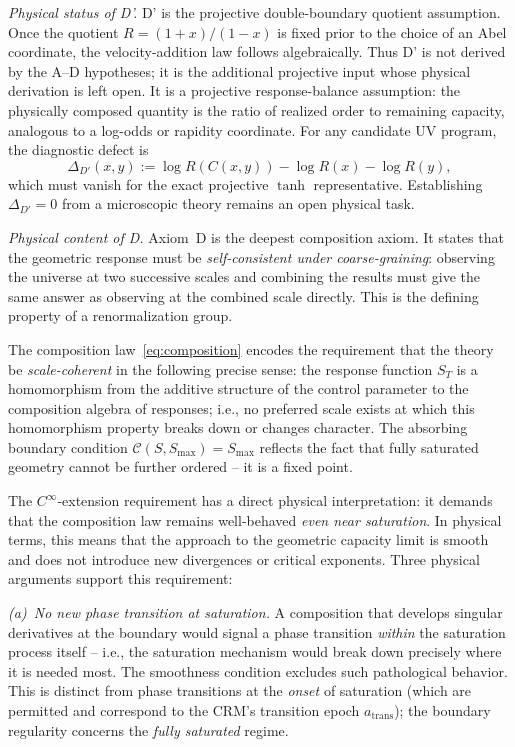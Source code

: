 \documentclass[aps,prd,twocolumn,superscriptaddress,nofootinbib]{revtex4-2}
\begin{document}
\textit{Physical status of D'.} D' is the projective double-boundary quotient assumption. Once the quotient $R=(1+x)/(1-x)$ is fixed prior to the choice of an Abel coordinate, the velocity-addition law follows algebraically. Thus D' is not derived by the A--D hypotheses; it is the additional projective input whose physical derivation is left open. It is a projective response-balance assumption: the physically composed quantity is the ratio of realized order to remaining capacity, analogous to a log-odds or rapidity coordinate. For any candidate UV program, the diagnostic defect is
\[
  \Delta_{D'}(x,y):=\log R(C(x,y))-\log R(x)-\log R(y),
\]
which must vanish for the exact projective $\tanh$ representative. Establishing $\Delta_{D'}=0$ from a microscopic theory remains an open physical task.

\textit{Physical content of D.} Axiom~D is the deepest composition axiom. It states that the geometric response must be \textit{self-consistent under coarse-graining}: observing the universe at two successive scales and combining the results must give the same answer as observing at the combined scale directly. This is the defining property of a renormalization group.

The composition law~\eqref{eq:composition} encodes the requirement that the theory be \textit{scale-coherent} in the following precise sense: the response function $S_T$ is a homomorphism from the additive structure of the control parameter to the composition algebra of responses; i.e., no preferred scale exists at which this homomorphism property breaks down or changes character. The absorbing boundary condition $\mathcal{C}(S, S_{\max}) = S_{\max}$ reflects the fact that fully saturated geometry cannot be further ordered -- it is a fixed point.

The $C^\infty$-extension requirement has a direct physical interpretation: it demands that the composition law remains well-behaved \textit{even near saturation}. In physical terms, this means that the approach to the geometric capacity limit is smooth and does not introduce new divergences or critical exponents. Three physical arguments support this requirement:

\textit{(a)~No new phase transition at saturation.} A composition that develops singular derivatives at the boundary would signal a phase transition \textit{within} the saturation process itself -- i.e., the saturation mechanism would break down precisely where it is needed most. The smoothness condition excludes such pathological behavior. This is distinct from phase transitions at the \textit{onset} of saturation (which are permitted and correspond to the CRM's transition epoch $a_{\mathrm{trans}}$); the boundary regularity concerns the \textit{fully saturated} regime.
\end{document}
